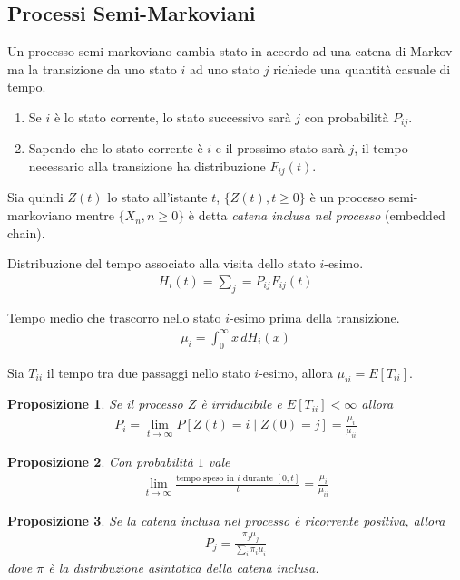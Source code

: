 \documentclass{article}
\newtheorem{proposizione}{Proposizione}[section]
\begin{document}
\subsection{Processi Semi-Markoviani}

Un processo semi-markoviano cambia stato in accordo ad una catena di Markov ma la transizione da uno stato $i$ ad uno stato $j$ richiede una quantità casuale di tempo.
\begin{enumerate}
    \item Se $i$ è lo stato corrente, lo stato successivo sarà $j$ con probabilità $P_{ij}$.
    \item Sapendo che lo stato corrente è $i$ e il prossimo stato sarà $j$, il tempo necessario alla transizione ha distribuzione $F_{ij}(t)$.
\end{enumerate}
Sia quindi $Z(t)$ lo stato all'istante $t$, $\{Z(t),t\ge 0\}$ è un processo semi-markoviano mentre $\{X_n, n\ge 0\}$ è detta \emph{catena inclusa nel processo} (embedded chain).

Distribuzione del tempo associato alla visita dello stato $i$-esimo.
\begin{align}
H_i(t) = \sum_j = P_{ij}F_{ij}(t)
\end{align}

Tempo medio che trascorro nello stato $i$-esimo prima della transizione.
\begin{align}
\mu_i =\int_0^{\infty} x\,dH_i(x)
\end{align}

Sia $T_{ii}$ il tempo tra due passaggi nello stato $i$-esimo, allora $\mu_{ii} = E[T_{ii}]$.

\begin{proposizione}
Se il processo $Z$ è irriducibile e $E[T_{ii}] < \infty$ allora
\begin{align}
P_i = \lim_{t\to\infty} P[Z(t) = i\mid Z(0) = j] = \frac{\mu_i}{\mu_{ii}}
\end{align}
\end{proposizione}

\begin{proposizione}
Con probabilità $1$ vale
\begin{align}
\lim_{t\to\infty} \frac{\text{tempo speso in $i$ durante $[0,t]$}}{t} = \frac{\mu_i}{\mu_{ii}}
\end{align}
\end{proposizione}

\begin{proposizione}
Se la catena inclusa nel processo è ricorrente positiva, allora
\begin{align}
P_j = \frac{\pi_j \mu_j}{\sum_i \pi_i \mu_i}
\end{align}
dove $\pi$ è la distribuzione asintotica della catena inclusa.
\end{proposizione}
\end{document}
